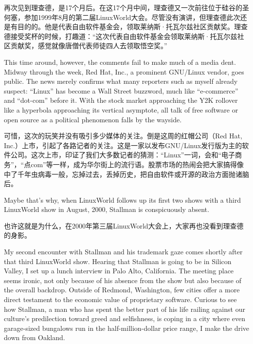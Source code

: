 \ifdefined\chs
再次见到理查德，是17个月后。在这17个月中间，理查德又一次前往位于硅谷的圣何塞，参加1999年8月的第二届LinuxWorld大会。尽管没有演讲，但理查德此次还是有目的的。他是代表自由软件基金会，领取莱纳斯·托瓦尔兹社区贡献奖。理查德接受奖杯的时候，打趣道：“这次代表自由软件基金会领取莱纳斯·托瓦尔兹社区贡献奖，感觉就像唐僧代表师徒四人去领取悟空奖。”
\fi

\ifdefined\eng
This time around, however, the comments fail to make much of a media dent. Midway through the week, Red Hat, Inc., a prominent GNU/Linux vendor, goes public. The news merely confirms what many reporters such as myself already suspect: ``Linux'' has become a Wall Street buzzword, much like ``e-commerce'' and ``dot-com'' before it. With the stock market approaching the Y2K rollover like a hyperbola approaching its vertical asymptote, all talk of free software or open source as a political phenomenon falls by the wayside.
\fi

\ifdefined\chs
可惜，这次的玩笑并没有吸引多少媒体的关注。倒是这周的红帽公司（Red Hat, Inc.）上市，引起了各路记者的关注。这是一家以发布GNU/Linux发行版为主的软件公司。这次上市，印证了我们大多数记者的猜测：“Linux”一词，会和“电子商务”，“点com”等一样，成为华尔街上的流行语。股票市场的热闹会把大家搞得像中了千年虫病毒一般，忘掉过去，丢掉历史，把自由软件或开源的政治方面抛诸脑后。
\fi

\ifdefined\eng
Maybe that's why, when LinuxWorld follows up its first two shows with a third LinuxWorld show in August, 2000, Stallman is conspicuously absent.
\fi

\ifdefined\chs
也许这就是为什么，在2000年第三届LinuxWorld大会上，大家再也没看到理查德的身影。
\fi

\ifdefined\eng
My second encounter with Stallman and his trademark gaze comes shortly after that third LinuxWorld show. Hearing that Stallman is going to be in Silicon Valley, I set up a lunch interview in Palo Alto, California. The meeting place seems ironic, not only because of his absence from the show but also because of the overall backdrop. Outside of Redmond, Washington, few cities offer a more direct testament to the economic value of proprietary software. Curious to see how Stallman, a man who has spent the better part of his life railing against our culture's predilection toward greed and selfishness, is coping in a city where even garage-sized bungalows run in the half-million-dollar price range, I make the drive down from Oakland.
\fi

